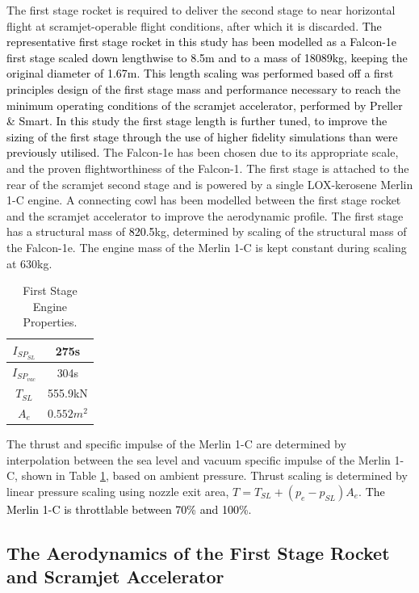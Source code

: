 The first stage rocket is required to deliver the second stage to near horizontal flight at scramjet-operable flight conditions,
after which it is discarded. 
\textcolor{black}{The representative first stage rocket in this study has been  modelled as a Falcon-1e first stage scaled down
lengthwise to 8.5m and to a mass of 18089kg, keeping the original diameter of 1.67m\cite{Vehicle2008}. This length scaling was performed based off a first principles design of the first stage mass and performance necessary to reach the minimum operating conditions of the scramjet accelerator, performed by Preller \& Smart\cite{Preller2017b}. In this study the first stage length is further tuned, to improve the sizing of the first stage through the use of higher fidelity simulations than were previously utilised.}
The Falcon-1e has been chosen due to its appropriate scale, and the proven flightworthiness of the Falcon-1. 
 The first stage is attached to the rear of the scramjet
second stage and is powered by a single LOX-kerosene Merlin 1-C engine. A connecting cowl has been modelled between the first stage rocket and the scramjet accelerator to improve the aerodynamic profile.  The first stage has a structural mass of
\textcolor{black}{820.5}kg, determined by scaling of the structural mass of the Falcon-1e. The engine mass of the Merlin 1-C is kept constant during scaling at 630kg\cite{Wade2017}.

\begin{table}[!h]
	\centering
	\begin{tabular}{|c|c|}
		\hline  $I_{SP_{SL}}$ & 275s \\ 
		\hline  $I_{SP_{vac}}$ & 304s\\ 
		\hline  $T_{SL}$ & 555.9kN \\ 
		\hline  $A_{e}$ & $0.552m^2$ \\ 
		\hline 
	\end{tabular} 
	\caption{First Stage Engine Properties\cite{Wade2017}.}
	\label{tab:1stStageEngine}
\end{table}
The thrust and specific impulse of the Merlin 1-C are determined by interpolation between the sea level and vacuum specific impulse of the Merlin 1-C, shown in Table \ref{tab:1stStageEngine}, based on ambient pressure. Thrust scaling is determined by linear pressure scaling using nozzle exit area, $T = T_{SL} + (p_e - p_{SL})A_e$. 
 \textcolor{black}{The Merlin 1-C is throttlable between 70\% and 100\%\cite{Norris2011}}.




  \subsection{The Aerodynamics of the First Stage Rocket and Scramjet Accelerator}\label{sec:firststageaero}
  
